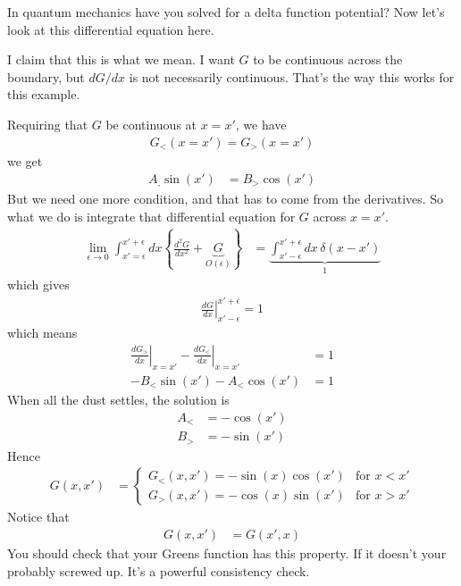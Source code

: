 In quantum mechanics have you solved for a delta function potential?
Now let's look at this differential equation here.

I claim that this is what we mean.
I want $G$ to be continuous across the boundary,
but $dG/dx$ is not necessarily continuous.
That's the way this works for this example.

Requiring that $G$ be continuous at $x=x'$,
we have
\begin{align}
    G_{<}\left( x = x' \right)
    =
    G_{>}\left( x = x' \right)
\end{align}
we get
\begin{align}
    A_{,}\sin\left( x' \right)
    &=
    B_{>}\cos\left( x' \right)
\end{align}
But we need one more condition,
and that has to come from the derivatives.
So what we do is integrate that differential equation for $G$ across $x=x'$.
\begin{align}
    \lim_{\epsilon\to 0}
    \int_{x'=\epsilon}^{x' + \epsilon}dx\left\{ 
    \frac{d^2 G}{dx^2} + \underbrace{G}_{O(\epsilon)}
    \right\}
    &=
    \underbrace{\int_{x' - \epsilon}^{x' + \epsilon}
    dx\,
    \delta\left( x - x' \right)}_{1}
\end{align}
which gives
\begin{align}
    \left.\frac{dG}{dx}\right|_{x'-\epsilon}^{x'+\epsilon}
    = 1
\end{align}
which means
\begin{align}
    \left. \frac{dG_{>}}{dx}\right|_{x=x'}
    -
    \left. \frac{dG_{<}}{dx}\right|_{x=x'}
    &= 1\\
    -B_{<}\sin\left( x' \right) - A_{<}\cos\left( x' \right) &= 1
\end{align}
When all the dust settles,
the solution is
\begin{align}
    A_{<} &= -\cos\left( x' \right)\\
    B_{>} &= -\sin\left( x' \right)
\end{align}
Hence
\begin{align}
    G\left( x, x' \right)
    &=
    \begin{cases}
        G_{<}\left( x, x' \right)
        =
        -\sin\left( x \right)\cos\left( x' \right)
        &\text{for } x<x'\\
        G_{>}\left( x, x' \right)
        =
        -\cos\left( x \right)\sin\left( x' \right)
        &\text{for } x> x'
    \end{cases}
\end{align}
Notice that
\begin{align}
    G\left( x, x' \right) &= G\left( x', x \right)
\end{align}
You should check that your Greens function has this property.
If it doesn't your probably screwed up.
It's a powerful consistency check.

